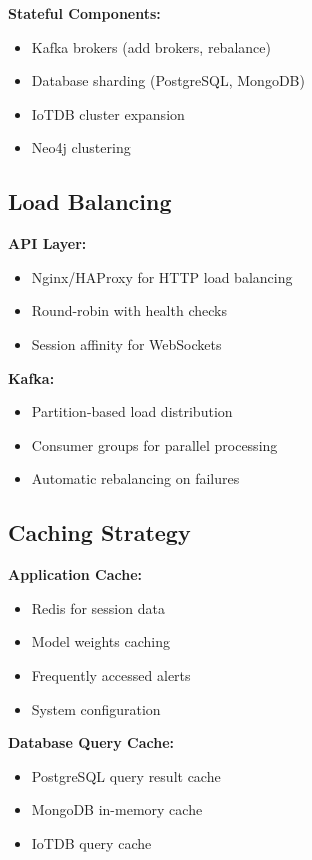 \documentclass[12pt,a4paper]{article}
\begin{document}
\textbf{Stateful Components:}
\begin{itemize}[leftmargin=1cm,itemsep=0pt]
    \item Kafka brokers (add brokers, rebalance)
    \item Database sharding (PostgreSQL, MongoDB)
    \item IoTDB cluster expansion
    \item Neo4j clustering
\end{itemize}


\subsection{Load Balancing}

\textbf{API Layer:}
\begin{itemize}[leftmargin=1cm,itemsep=0pt]
    \item Nginx/HAProxy for HTTP load balancing
    \item Round-robin with health checks
    \item Session affinity for WebSockets
\end{itemize}

\textbf{Kafka:}
\begin{itemize}[leftmargin=1cm,itemsep=0pt]
    \item Partition-based load distribution
    \item Consumer groups for parallel processing
    \item Automatic rebalancing on failures
\end{itemize}

\subsection{Caching Strategy}

\textbf{Application Cache:}
\begin{itemize}[leftmargin=1cm,itemsep=0pt]
    \item Redis for session data
    \item Model weights caching
    \item Frequently accessed alerts
    \item System configuration
\end{itemize}

\textbf{Database Query Cache:}
\begin{itemize}[leftmargin=1cm,itemsep=0pt]
    \item PostgreSQL query result cache
    \item MongoDB in-memory cache
    \item IoTDB query cache
\end{itemize}
\end{document}
